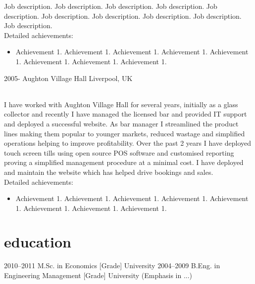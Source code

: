 \documentclass[]{cv-style}          %
\begin{document}
\begin{entrylist}
{  Job description. Job description. Job description. Job description. Job description. Job description. Job description. Job description. Job description. Job description.\\
  Detailed achievements:
  \begin{itemize}
    \item Achievement 1. Achievement 1. Achievement 1. Achievement 1. Achievement 1. Achievement 1. Achievement 1. Achievement 1. 
  \end{itemize}}
\entry
  {2005-}
  {Aughton Village Hall}
  {Liverpool, UK}
  {\\{I have worked with Aughton Village Hall for several years, initially as a glass collector and recently I have managed the licensed bar and provided IT support and deployed a successful website. As bar manager I streamlined the product lines making them popular to younger markets, reduced wastage and simplified operations helping to improve profitability. Over the past 2 years I have deployed touch screen tills using open source POS software and customised reporting proving a simplified management procedure at a minimal cost. I have deployed and maintain the website which has helped drive bookings and sales.\\}
    Detailed achievements:
  \begin{itemize}
    \item Achievement 1. Achievement 1. Achievement 1. Achievement 1. Achievement 1. Achievement 1. Achievement 1. Achievement 1. 
  \end{itemize}}

\end{entrylist}


\section{education}

\begin{entrylist}
\entry
{2010--2011}
{M.Sc. {\normalfont in Economics [Grade]}}
{University}
{\vspace{-0.3cm}}
\entry
{2004--2009}
{B.Eng. {\normalfont in Engineering Management [Grade]}}
{University}
{(Emphasis in ...)}
\end{entrylist}
\end{document}
